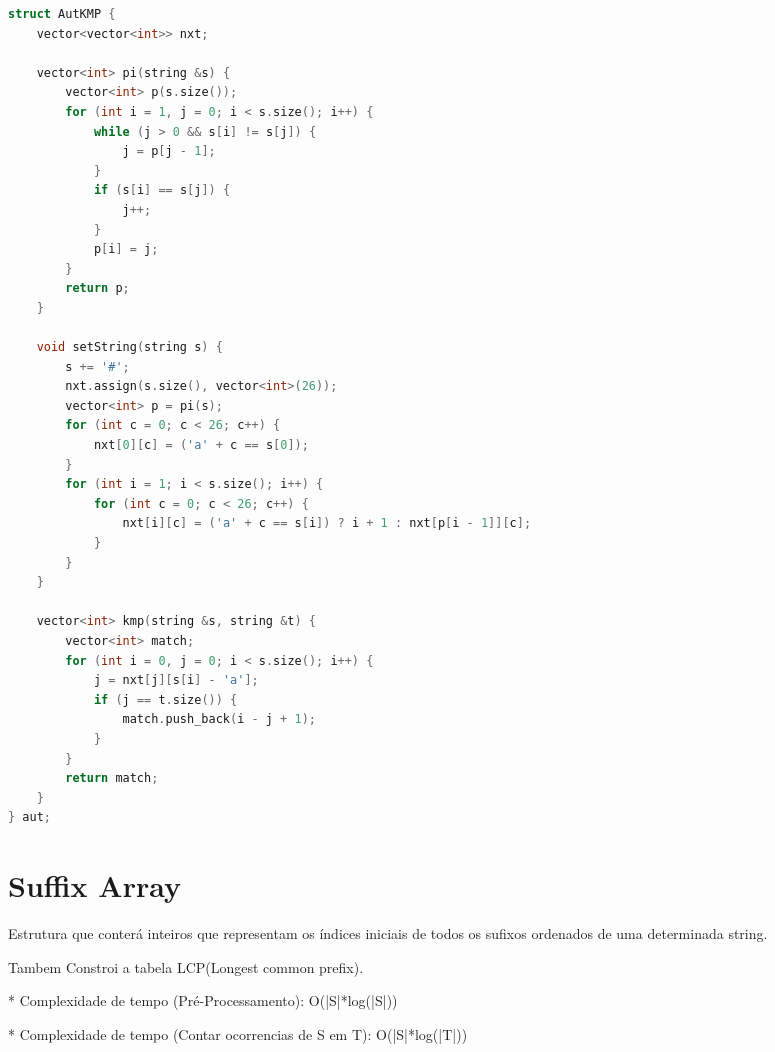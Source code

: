 \documentclass[11pt, a4paper, oneside]{book}
\begin{document}
\begin{multicols}{2}
\begin{lstlisting}[language=C++]
struct AutKMP {
    vector<vector<int>> nxt;

    vector<int> pi(string &s) {
        vector<int> p(s.size());
        for (int i = 1, j = 0; i < s.size(); i++) {
            while (j > 0 && s[i] != s[j]) {
                j = p[j - 1];
            }
            if (s[i] == s[j]) {
                j++;
            }
            p[i] = j;
        }
        return p;
    }

    void setString(string s) {
        s += '#';
        nxt.assign(s.size(), vector<int>(26));
        vector<int> p = pi(s);
        for (int c = 0; c < 26; c++) {
            nxt[0][c] = ('a' + c == s[0]);
        }
        for (int i = 1; i < s.size(); i++) {
            for (int c = 0; c < 26; c++) {
                nxt[i][c] = ('a' + c == s[i]) ? i + 1 : nxt[p[i - 1]][c];
            }
        }
    }

    vector<int> kmp(string &s, string &t) {
        vector<int> match;
        for (int i = 0, j = 0; i < s.size(); i++) {
            j = nxt[j][s[i] - 'a'];
            if (j == t.size()) {
                match.push_back(i - j + 1);
            }
        }
        return match;
    }
} aut;
\end{lstlisting}
\end{multicols}

\hfill

\section{Suffix Array}


Estrutura que conterá inteiros que representam os índices iniciais de todos os sufixos ordenados de uma determinada string.



Tambem Constroi a tabela LCP(Longest common prefix).



* Complexidade de tempo (Pré-Processamento): O(|S|*log(|S|))

* Complexidade de tempo (Contar ocorrencias de S em T): O(|S|*log(|T|))
\hfill
\end{document}
